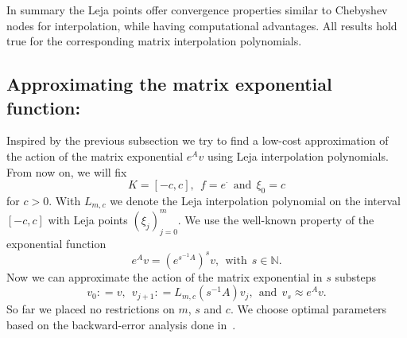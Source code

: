 \documentclass{scrartcl}
\newcommand{\defneq}{\mathrel{\mathop:}=}
\begin{document}
	In summary the Leja points offer convergence properties similar to Chebyshev nodes for interpolation, while having computational advantages. All results hold true for the corresponding matrix interpolation polynomials.
	
	\subsection{Approximating the matrix exponential function:} \label{sec:ApproxMatrixExponential}
	Inspired by the previous subsection we try to find a low-cost approximation of the action of the matrix exponential $e^Av$ using Leja interpolation polynomials. From now on, we will fix 
	\[K=[-c,c], ~~ f = e^\cdot  ~~\text{and}~~ \xi_0 = c \]
	for $c>0$. With $L_{m,c}$ we denote the Leja interpolation polynomial on the interval $[-c,c]$ with Leja points $(\xi_j)_{j=0}^{m}$. We use the well-known property of the exponential function
	\[e^Av = (e^{s^{-1}A})^sv, ~~\text{with}~~ s\in\mathbb{N}.\]
	Now we can approximate the action of the matrix exponential in $s$ substeps
	\[v_0\defneq v, ~~ v_{j+1}\defneq L_{m,c}(s^{-1}A)v_j, ~~\text{and}~~ v_s \approx e^Av.\]
	So far we placed no restrictions on $m$, $s$ and $c$. We choose optimal parameters based on the backward-error analysis done in~\cite{lejarev}.
	
\end{document}
